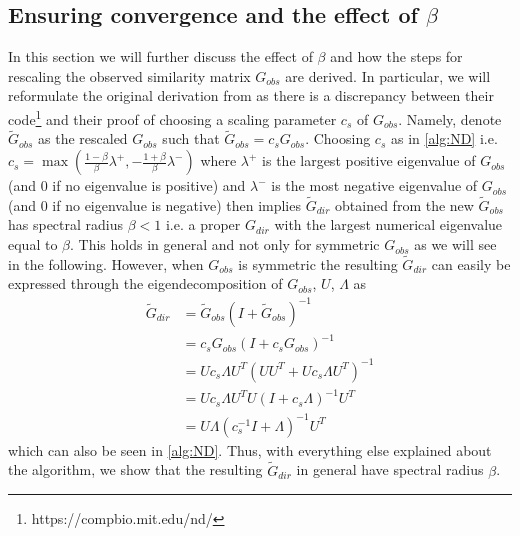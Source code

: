 \documentclass[../Thesis.tex]{subfiles}
\begin{document}
\subsection{Ensuring convergence and the effect of \texorpdfstring{$\beta$}{beta}}
In this section we will further discuss the effect of $\beta$ and how the steps for rescaling the observed similarity matrix $G_{obs}$ are derived. In particular, we will reformulate the original derivation from \cite{Network-deconvolution-as-a-general-method-to-distinguish-direct-dependencies-in-networks} as there is a discrepancy between their code\footnote{https://compbio.mit.edu/nd/} and their proof of choosing a scaling parameter $c_s$ of $G_{obs}$. Namely, denote $\tilde{G}_{obs}$ as the rescaled $G_{obs}$ such that $\tilde{G}_{obs} = c_s G_{obs}$. Choosing $c_s$ as in \autoref{alg:ND} i.e. $c_s = \max \left( \frac{1-\beta}{\beta} \lambda^+,  -\frac{1+\beta}{\beta} \lambda^- \right)$ where $\lambda^+$ is the largest positive eigenvalue of $G_{obs}$ (and $0$ if no eigenvalue is positive) and $\lambda^-$ is the most negative eigenvalue of $G_{obs}$ (and $0$ if no eigenvalue is negative) then implies $\tilde{G}_{dir}$ obtained from the new $\tilde{G}_{obs}$ has spectral radius $\beta < 1$ i.e. a proper $G_{dir}$ with the largest numerical eigenvalue equal to $\beta$. This holds in general and not only for symmetric $G_{obs}$ as we will see in the following. However, when $G_{obs}$ is symmetric the resulting $\tilde{G}_{dir}$ can easily be expressed through the eigendecomposition of $G_{obs}$, $U$, $\Lambda$ as
\begin{align*}
    \tilde{G}_{dir} & = \tilde{G}_{obs} \left( I + \tilde{G}_{obs}\right)^{-1}         \\
                    & = c_s G_{obs} \left( I + c_s G_{obs}\right)^{-1}                 \\
                    & = U c_s \Lambda U^T \left( U U^T + U c_s \Lambda U^T\right)^{-1} \\
                    & = U c_s \Lambda U^T U \left( I + c_s \Lambda\right)^{-1} U^T     \\
                    & = U \Lambda \left(c_s^{-1} I + \Lambda\right)^{-1}U^T
\end{align*}
which can also be seen in \autoref{alg:ND}. Thus, with everything else explained about the algorithm, we show that the resulting $\tilde{G}_{dir}$ in general have spectral radius $\beta$.
\end{document}
